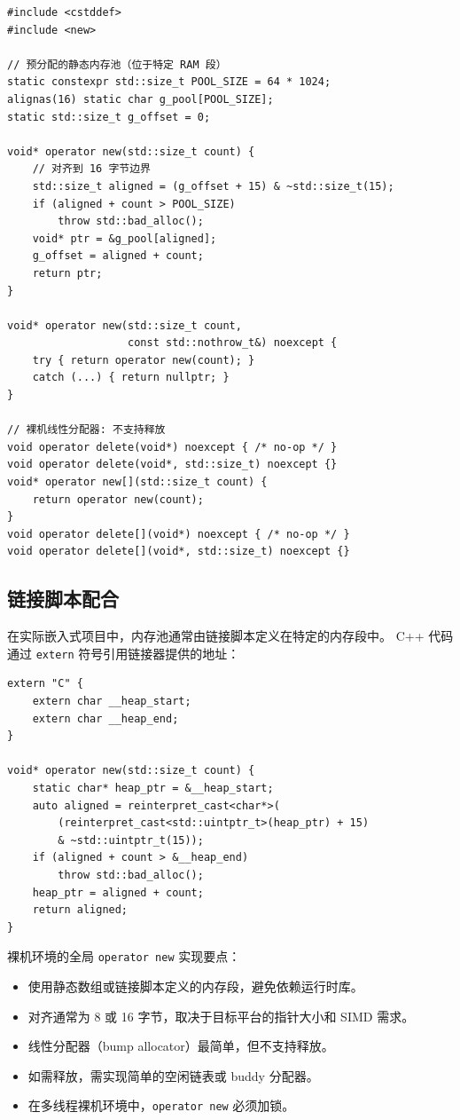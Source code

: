\documentclass[12pt,a4paper,fontset=fandol]{ctexbook}
\begin{document}
\begin{lstlisting}
#include <cstddef>
#include <new>

// 预分配的静态内存池（位于特定 RAM 段）
static constexpr std::size_t POOL_SIZE = 64 * 1024;
alignas(16) static char g_pool[POOL_SIZE];
static std::size_t g_offset = 0;

void* operator new(std::size_t count) {
    // 对齐到 16 字节边界
    std::size_t aligned = (g_offset + 15) & ~std::size_t(15);
    if (aligned + count > POOL_SIZE)
        throw std::bad_alloc();
    void* ptr = &g_pool[aligned];
    g_offset = aligned + count;
    return ptr;
}

void* operator new(std::size_t count,
                   const std::nothrow_t&) noexcept {
    try { return operator new(count); }
    catch (...) { return nullptr; }
}

// 裸机线性分配器: 不支持释放
void operator delete(void*) noexcept { /* no-op */ }
void operator delete(void*, std::size_t) noexcept {}
void* operator new[](std::size_t count) {
    return operator new(count);
}
void operator delete[](void*) noexcept { /* no-op */ }
void operator delete[](void*, std::size_t) noexcept {}
\end{lstlisting}

\subsection{链接脚本配合}

在实际嵌入式项目中，内存池通常由链接脚本定义在特定的内存段中。
C++ 代码通过 \texttt{extern} 符号引用链接器提供的地址：

\begin{lstlisting}
extern "C" {
    extern char __heap_start;
    extern char __heap_end;
}

void* operator new(std::size_t count) {
    static char* heap_ptr = &__heap_start;
    auto aligned = reinterpret_cast<char*>(
        (reinterpret_cast<std::uintptr_t>(heap_ptr) + 15)
        & ~std::uintptr_t(15));
    if (aligned + count > &__heap_end)
        throw std::bad_alloc();
    heap_ptr = aligned + count;
    return aligned;
}
\end{lstlisting}

\begin{guideline}
裸机环境的全局 \texttt{operator new} 实现要点：
\begin{itemize}
    \item 使用静态数组或链接脚本定义的内存段，避免依赖运行时库。
    \item 对齐通常为 8 或 16 字节，取决于目标平台的指针大小和 SIMD 需求。
    \item 线性分配器（bump allocator）最简单，但不支持释放。
    \item 如需释放，需实现简单的空闲链表或 buddy 分配器。
    \item 在多线程裸机环境中，\texttt{operator new} 必须加锁。
\end{itemize}
\end{guideline}
\end{document}
